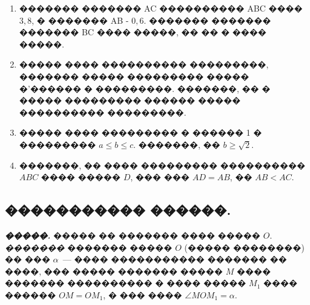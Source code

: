 \documentclass[a4paper,12pt]{article}
\begin{document}
\begin{enumerate}
\item ������� ������� AC ���������� ABC ���� $3,8$, � ������� AB - $0,6$. ������� ������� ������� BC ���� �����, �� �� � ���� �����.

\item ����� ���� ���������� ���������, ������� ����� ��������� ����� �'������ � ���������. �������, �� � ����� ��������� ������ ����� ���������� ���������.

\item ����� ���� ��������� � ������ 1 � ��������� $a\leq b \leq c$. �������, �� $b\geq \sqrt{2}$.

\item �������, �� ���� ��������� ���������� $ABC$ ���� ����� $D$, ��� ��� $AD=AB$, �� $AB<AC$.

\end{enumerate}







\newpage

\begin{center}
\section*{����������� ������.}
\end{center}

\textit{\textbf{�����.}} ����� �� ������� ���� ����� $O$. \textit{�������} ������� ����� $O$ (����� ��������) �� ��� $\alpha$~--- ���� ����������� ������� �� ����, ��� ����� ������� ����� $M$ ���� ������� ���������� � ���� ����� $M_{1}$ ���� ������ $OM=OM_{1}$, � ��� ���� $\angle MOM_{1}=\alpha$.

\medskip\medskip\medskip
\end{document}
